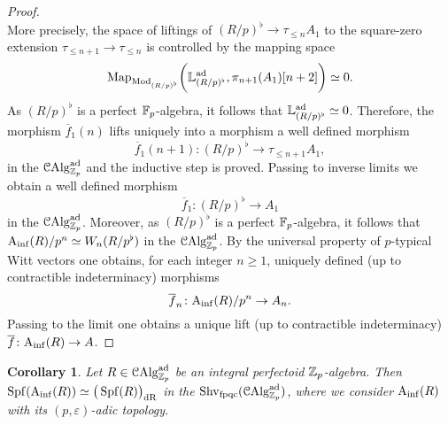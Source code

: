 \documentclass[10pt,a4paper]{amsart}
\numberwithin{equation}{subsection}
\newtheorem{corollary}[theorem]{Corollary}
\theoremstyle{definition}
\begin{document}
\begin{proof}
\[        \]
    More precisely, the space of liftings of $(R/p)^\flat \to \tau_{\leq n}A_1$ to the square-zero extension $\tau_{\leq n+1} \to \tau_{\leq n}$ is controlled by the mapping space
        \[
            \mathrm{Map}_{\mathrm{Mod}_{(R/p)^\flat}} \bigg(\mathbb{L}^{\mathrm{ad}}_{(R/p)^\flat}, \pi_{n+1}(A_1) [n+2] \bigg) \simeq 0.
        \]  
    As $(R/p)^\flat$ is a perfect $\mathbb F_p$-algebra, it follows that $\mathbb{L}^{\mathrm{ad}}_{(R/p)^\flat} \simeq 0 $. Therefore, the morphism $\overline{f}_1(n)$ lifts uniquely into a morphism a well defined morphism
        \[
                \overline{f}_1(n+1) \colon (R/p)^\flat \to \tau_{\leq n+1}A_1,  
        \]
    in the \infcat $\mathcal C \mathrm{Alg}^{\mathrm{ad}}_{\mathbb Z_p}$ and the inductive step is proved. Passing to inverse limits we obtain a well defined morphism
        \[
                \overline{f}_1 \colon (R/p)^\flat \to A_1
        \]
    in the \infcat $\mathcal C \mathrm{Alg}^{\mathrm{ad}}_{\mathbb Z_p}$.
    Moreover, as $(R/p)^\flat$ is a perfect $\mathbb F_p$-algebra, it follows that $\mathrm{A}_{\mathrm{inf}}(R)/p^n \simeq W_n(R/p^\flat)$ in the \infcat $\mathcal C \mathrm{Alg}^{\mathrm{ad}}_{\mathbb Z_p}$. By the universal property of $p$-typical Witt vectors one obtains, for each integer $n \geq 1$, uniquely defined (up to contractible indeterminacy) morphisms
        \[
            \overline{f}_n \colon \mathrm{A}_{\mathrm{inf}}(R)/p^n \to A_n.
        \]  
    Passing to the limit one obtains a unique lift (up to contractible indeterminacy) $\overline{f} \colon \mathrm{A}_{\mathrm{inf}}(R) \to A$. 
     

\end{proof}


\begin{corollary}
    Let $R \in \mathcal C \mathrm{Alg}^{\mathrm{ad}}_{\mathbb Z_p}$ be an integral perfectoid $\mathbb Z_p$-algebra. Then $\operatorname{Spf} (\mathrm{A}_{\mathrm{inf}}(R)) \simeq \big( \operatorname{Spf}(R) \big)_{\mathrm{dR}}$ in the \infcat $\mathrm{Shv}_{\mathrm{fpqc}}(\mathcal C \mathrm{Alg}^{\mathrm{ad}}_{\mathbb Z_p})$, where we consider $\mathrm{A}_{\mathrm{inf}}(R)$ with its $(p, \varepsilon)$-adic topology.
\end{corollary}
\end{document}
